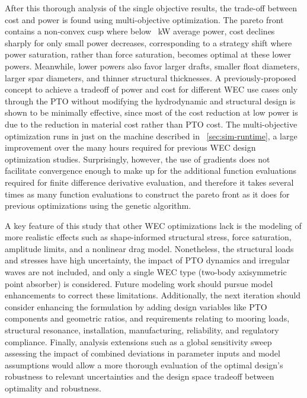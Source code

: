 \documentclass[preprint,12pt]{elsarticle}
\begin{document}
After this thorough analysis of the single objective results, the trade-off between cost and power is found using multi-objective optimization.
The pareto front contains a non-convex cusp where below \powerWhereCusp~kW average power, cost declines sharply for only small power decreases, corresponding to a strategy shift where power saturation, rather than force saturation, becomes optimal at these lower powers. 
Meanwhile, lower powers also favor larger drafts, smaller float diameters, larger spar diameters, and thinner structural thicknesses.
A previously-proposed concept to achieve a tradeoff of power and cost for different WEC use cases only through the PTO without modifying the hydrodynamic and structural design is shown to be minimally effective, since most of the cost reduction at low power is due to the reduction in material cost rather than PTO cost.
The multi-objective optimization runs in just \paretoRuntime on the machine described in \sectionautorefname~\ref{sec:sim-runtime}, a large improvement over the many hours required for previous WEC design optimization studies.
Surprisingly, however, the use of gradients does not facilitate convergence enough to make up for the additional function evaluations required for finite difference derivative evaluation, and therefore it takes several times as many function evaluations to construct the pareto front as it does for previous optimizations using the genetic algorithm.

A key feature of this study that other WEC optimizations lack is the modeling of more realistic effects such as shape-informed structural stress, force saturation, amplitude limits, and a nonlinear drag model.
Nonetheless, the structural loads and stresses have high uncertainty, the impact of PTO dynamics and irregular waves are not included, and only a single WEC type (two-body axisymmetric point absorber) is considered.
Future modeling work should pursue model enhancements to correct these limitations.
Additionally, the next iteration should consider enhancing the formulation by adding design variables like PTO components and geometric ratios, and requirements relating to mooring loads, structural resonance, installation, manufacturing, reliability, and regulatory compliance. 
Finally, analysis extensions such as a global sensitivity sweep assessing the impact of combined deviations in parameter inputs and model assumptions would allow a more thorough evaluation of the optimal design's robustness to relevant uncertainties and the design space tradeoff between optimality and robustness.
\end{document}
